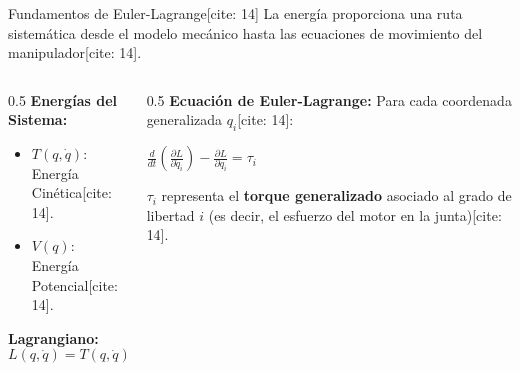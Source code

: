 \documentclass[aspectratio=169, xcolor={table,xcdraw}]{beamer}
\begin{document}
\begin{frame}{Fundamentos de Euler-Lagrange[cite: 14]}
    La energía proporciona una ruta sistemática desde el modelo mecánico hasta las ecuaciones de movimiento del manipulador[cite: 14].
    
    \begin{columns}[T]
        \begin{column}{0.5\textwidth}
            \textbf{Energías del Sistema:}
            \begin{itemize}
                \item $T(q, \dot{q})$: Energía Cinética[cite: 14].
                \item $V(q)$: Energía Potencial[cite: 14].
            \end{itemize}
            
            \vspace{0.3cm}
            \textbf{Lagrangiano:}
            \begin{equation*}
                \boxed{L(q, \dot{q}) = T(q, \dot{q}) - V(q)} \text{[cite: 14]}
            \end{equation*}
        \end{column}
        \begin{column}{0.5\textwidth}
            \textbf{Ecuación de Euler-Lagrange:}
            Para cada coordenada generalizada $q_i$[cite: 14]:
            \begin{center}
                $\displaystyle \boxed{ \frac{d}{dt}\left(\frac{\partial L}{\partial \dot{q}_i}\right) - \frac{\partial L}{\partial q_i} = \tau_i }$ \text{[cite: 14]}
            \end{center}
            
            \vspace{0.2cm}
            \footnotesize $\tau_i$ representa el \textbf{torque generalizado} asociado al grado de libertad $i$ (es decir, el esfuerzo del motor en la junta)[cite: 14].
        \end{column}
    \end{columns}
\end{frame}
\end{document}

